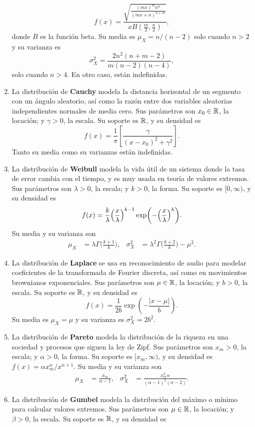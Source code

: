 \begin{enumerate}
	\[f(x) = \frac{\sqrt{\frac{(mx)^m n^n}{(mx+n)^{n+m}}}}{x B(\frac{m}{2}, \frac{n}{2})},\]
	donde \(B\) es la función beta. Su media es \(\mu_X = n / (n - 2)\) solo cuando \(n > 2\) y su varianza es
	\[\sigma^2_X = \frac{2n^2 (n+m-2)}{m(n-2) (n-4)},\]
	solo cuando \(n > 4\). En otro caso, están indefinidas.
	\item La distribución de \textbf{Cauchy} modela la distancia horizontal de un segmento con un ángulo aleatorio, así como la razón entre dos variables aleatorias independientes normales de media cero. Sus parámetros son \(x_0 \in \mathbb{R}\), la locación; y \(\gamma > 0\), la escala. Su soporte es \(\mathbb{R}\), y su densidad es
	\[f(x) = \frac{1}{\pi} \left[\frac{\gamma}{(x - x_0)^2 + \gamma^2} \right].\]
	Tanto su media como su varianzas están indefinidas.
	\item La distribución de \textbf{Weibull} modela la vida útil de un sistema donde la tasa de error cambia con el tiempo, y es muy usada en teoría de valores extremos. Sus parámetros son \(\lambda > 0\), la escala; y \(k > 0\), la forma. Su soporte es \([0, \infty)\), y su densidad es
	\[f(x) = \frac{k}{\lambda}\Bigl(\frac{x}{\lambda}\Bigr)^{k-1} \exp(-\Bigl(\frac{x}{\lambda}\Bigr)^k).\]
	Su media y su varianza son
	\begin{align*}
		\mu_X	&= \lambda \Gamma\biggl(\frac{k+1}{k}\biggr),	& \sigma^2_X	& = \lambda^2 \Gamma\biggl(\frac{k+2}{k}\biggr) - \mu^2.
	\end{align*}
	\item La distribución de \textbf{Laplace} se usa en reconocimiento de audio para modelar coeficientes de la transformada de Fourier discreta, así como en movimientos brownianos exponenciales. Sus parámetros son \(\mu \in \mathbb{R}\), la locación; y \(b > 0\), la escala. Su soporte es \(\mathbb{R}\), y su densidad es
	\[f(x) = \frac{1}{2b} \exp(-\frac{\lvert x - \mu \rvert}{b}).\]
	Su media es \(\mu_X = \mu\) y su varianza es \(\sigma_X^2 = 2b^2\).
	\item La distribución de \textbf{Pareto} modela la distribución de la riqueza en una sociedad y procesos que siguen la ley de Zipf. Sus parámetros son \(x_m > 0\), la escala; y \(\alpha > 0\), la forma. Su soporte es \([x_m, \infty)\), y su densidad es \(f(x) = \alpha x_m^\alpha / x^{\alpha + 1}\). Su media y su varianza son
	\begin{align*}
		\mu_X	&= \frac{x_m}{\alpha-1},	& \sigma^2_X	&= \frac{x_m^2 \alpha}{(\alpha-1)^2 (\alpha-2)}.
	\end{align*}
	\item La distribución de \textbf{Gumbel} modela la distribución del máximo o mínimo para calcular valores extremos. Sus parámetros son \(\mu \in \mathbb{R}\), la locación; y \(\beta > 0\), la escala. Su soporte es \(\mathbb{R}\), y su densidad es

\end{enumerate}
